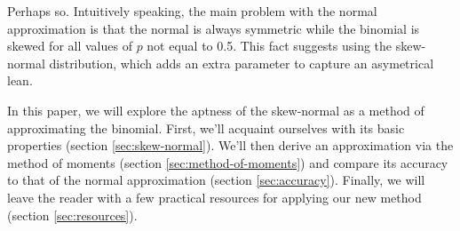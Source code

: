 Perhaps so. Intuitively speaking, the main problem with the normal
approximation is that the normal is always symmetric while the binomial is
skewed for all values of $p$ not equal to 0.5. This fact suggests using the
skew-normal distribution, which adds an extra parameter to capture an
asymetrical lean.

In this paper, we will explore the aptness of the skew-normal as a method of
approximating the binomial. First, we'll acquaint ourselves with its basic
properties (section \ref{sec:skew-normal}). We'll then derive an approximation
via the method of moments (section \ref{sec:method-of-moments}) and compare its
accuracy to that of the normal approximation (section \ref{sec:accuracy}).
Finally, we will leave the reader with a few practical resources for applying
our new method (section \ref{sec:resources}).
